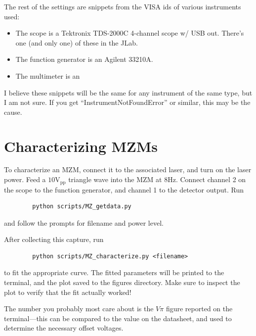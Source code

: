 \documentclass{article}
\begin{document}
    The rest of the settings are snippets from the VISA ids of various instruments used:
    \begin{itemize}
        \item The scope is a Tektronix TDS-2000C 4-channel scope w/ USB out. There's one (and only one) of these in the JLab.
        \item The function generator is an Agilent 33210A.
        \item The multimeter is an
    \end{itemize}
    I believe these snippets will be the same for any instrument of the same type, but I am not sure. If you get ``InstrumentNotFoundError'' or similar, this may be the cause.

    \section{Characterizing MZMs}

    To characterize an MZM, connect it to the associated laser, and turn on the laser power. Feed a $10\text{V}_{\text{pp}}$ triangle wave into the MZM at 8Hz. Connect channel 2 on the scope to the function generator, and channel 1 to the detector output. Run
    \begin{lstlisting}
        python scripts/MZ_getdata.py
    \end{lstlisting}
    and follow the prompts for filename and power level.

    After collecting this capture, run
    \begin{lstlisting}
        python scripts/MZ_characterize.py <filename>
    \end{lstlisting}
    to fit the appropriate curve. The fitted parameters will be printed to the terminal, and the plot saved to the figures directory. Make sure to inspect the plot to verify that the fit actually worked!

    The number you probably most care about is the $V\pi$ figure reported on the terminal---this can be compared to the value on the datasheet, and used to determine the necessary offset voltages.
\end{document}
